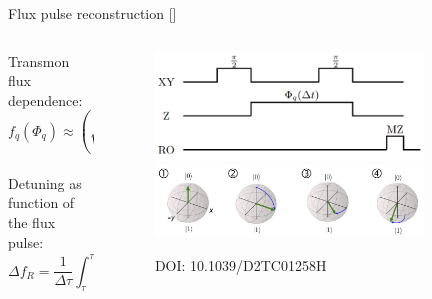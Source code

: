 \documentclass[aspectratio=169,10pt]{beamer}
\begin{document}
\begin{frame}{Flux pulse reconstruction [\cite{rol_time-domain_2020}]}
  \begin{columns}
    \begin{column}{0.5\textwidth}
      \centering
      Transmon flux dependence:
      \begin{equation*}
        f_q(\Phi_q) \approx \left( \sqrt{8E_J E_C \left| \cos\left(\pi \frac{\Phi_q}{\Phi_0}\right) \right|} \right)
      \end{equation*}\\
      \vspace{3em}
      Detuning as function of the flux pulse:
      \begin{equation*}
        \Delta f_R = \frac{1}{\Delta \tau} \int_{\tau}^{\tau + \Delta \tau} \Delta f_q(\Phi_{q, \tau + \Delta \tau} (t))
      \end{equation*}
    \end{column}
    \begin{column}{0.5\textwidth}
      \begin{figure}
        \centering
        \includegraphics[width=0.85\textwidth]{figures/cryoscope_pulse.png}\\
        \vspace{3em}
        \includegraphics[width=0.85\textwidth]{figures/BlochEvolution.png}
        \caption{DOI: 10.1039/D2TC01258H}
      \end{figure}
    \end{column}
  \end{columns}
\end{frame}
\end{document}
